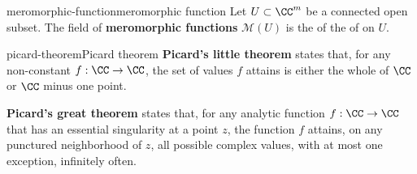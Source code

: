 \begin{topic}{meromorphic-function}{meromorphic function}
    Let $U \subset \CC^m$ be a connected open subset. The field of \textbf{meromorphic functions} $\mathcal{M}(U)$ is the  of the  of  on $U$.
\end{topic}

\begin{topic}{picard-theorem}{Picard theorem}
    \textbf{Picard's little theorem} states that, for any non-constant  $f : \CC \to \CC$, the set of values $f$ attains is either the whole of $\CC$ or $\CC$ minus one point.

    \textbf{Picard's great theorem} states that, for any analytic function $f : \CC \to \CC$ that has an essential singularity at a point $z$, the function $f$ attains, on any punctured neighborhood of $z$, all possible complex values, with at most one exception, infinitely often.
\end{topic}

